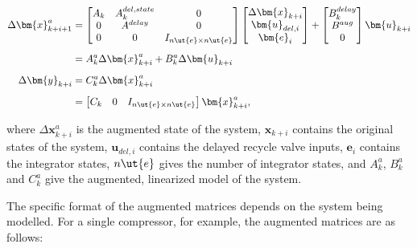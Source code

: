 \begin{equation}
  \begin{split}
    \Delta \bm{x}_{k+i+1}^a     & =
\begin{bmatrix}
      A_k & A_k^{del,state} & 0 \\
      0 & A^{delay} & 0\\
      0 & 0 & I_{n\ut{e}\times n\ut{e}}
    \end{bmatrix}
    \begin{bmatrix}
      \Delta \bm{x}_{k+i}\\
      \bm{u}_{del,i}\\
      \bm{e}_{i}
    \end{bmatrix} + 
\begin{bmatrix}
      B_k^{delay}\\
      B^{aug}\\
      0
    \end{bmatrix} \bm{u}_{k+i}\\[0.5em]
    & = A_k^a \Delta \bm{x}_{k+i}^a + B_k^a \Delta \bm{u}_{k+i}\\[0.5em]
    \Delta \bm{y}_{k+i} & = C_k^a \Delta \bm{x}_{k+i}^a\\[0.5em]
    & = \begin{bmatrix}
      C_k & 0 & I_{n\ut{e} \times n\ut{e}}
    \end{bmatrix}
    \bm{x}_{k+i}^a,\\
  \end{split}
\end{equation}

\noindent where $\Delta \bm{x}_{k+i}^a$ is the augmented state of the system, 
$\bm{x}_{k+i}$ contains the original states of the system, 
$\bm{u}_{del,i}$ contains the delayed recycle valve inputs,
$\bm{e}_i$ contains the integrator states,
$n\ut{e}$ gives the number of integrator states,
and $A_k^a$, $B_k^a$ and $C_k^a$ give the augmented, linearized model of the system.

The specific format of the augmented matrices depends on the system being modelled. For a single compressor, for example, the augmented matrices are as follows:

